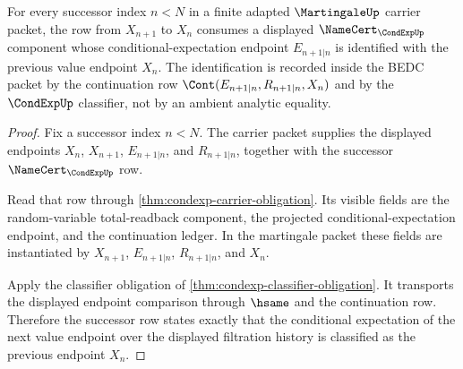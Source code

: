 \begin{theorem}
\label{thm:martingale-condexp-step-law}
For every successor index $n<N$ in a finite adapted
$\MartingaleUp$ carrier packet, the row from $X_{n+1}$ to $X_n$ consumes a
displayed $\NameCert_{\CondExpUp}$ component whose conditional-expectation
endpoint $E_{n+1|n}$ is identified with the previous value endpoint $X_n$.
The identification is recorded inside the BEDC packet by the continuation row
$\Cont(E_{n+1|n},R_{n+1|n},X_n)$ and by the $\CondExpUp$ classifier, not by an
ambient analytic equality.
\end{theorem}
\begin{proof}
Fix a successor index $n<N$. The carrier packet supplies the displayed
endpoints $X_n$, $X_{n+1}$, $E_{n+1|n}$, and $R_{n+1|n}$, together with the
successor $\NameCert_{\CondExpUp}$ row.

Read that row through \autoref{thm:condexp-carrier-obligation}. Its visible
fields are the random-variable total-readback component, the projected
conditional-expectation endpoint, and the continuation ledger. In the
martingale packet these fields are instantiated by $X_{n+1}$,
$E_{n+1|n}$, $R_{n+1|n}$, and $X_n$.

Apply the classifier obligation of
\autoref{thm:condexp-classifier-obligation}. It transports the displayed
endpoint comparison through $\hsame$ and the continuation row. Therefore the
successor row states exactly that the conditional expectation of the next
value endpoint over the displayed filtration history is classified as the
previous endpoint $X_n$.
\end{proof}

